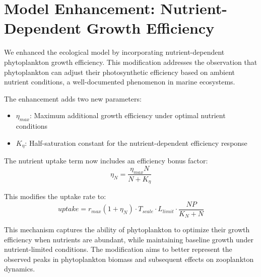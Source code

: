 \section{Model Enhancement: Nutrient-Dependent Growth Efficiency}

We enhanced the ecological model by incorporating nutrient-dependent phytoplankton growth efficiency. This modification addresses the observation that phytoplankton can adjust their photosynthetic efficiency based on ambient nutrient conditions, a well-documented phenomenon in marine ecosystems.

The enhancement adds two new parameters:
\begin{itemize}
    \item $\eta_{max}$: Maximum additional growth efficiency under optimal nutrient conditions
    \item $K_{\eta}$: Half-saturation constant for the nutrient-dependent efficiency response
\end{itemize}

The nutrient uptake term now includes an efficiency bonus factor:
$$ \eta_N = \frac{\eta_{max} N}{N + K_{\eta}} $$

This modifies the uptake rate to:
$$ uptake = r_{max}(1 + \eta_N) \cdot T_{scale} \cdot L_{limit} \cdot \frac{NP}{K_N + N} $$

This mechanism captures the ability of phytoplankton to optimize their growth efficiency when nutrients are abundant, while maintaining baseline growth under nutrient-limited conditions. The modification aims to better represent the observed peaks in phytoplankton biomass and subsequent effects on zooplankton dynamics.
